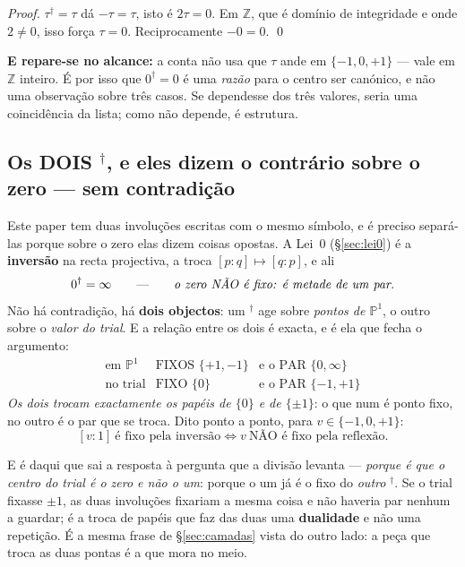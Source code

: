 \documentclass[11pt,a4paper]{article}
\newcommand{\dg}{^{\dagger}}
\begin{document}
\begin{proof}
$\tau\dg=\tau$ dá $-\tau=\tau$, isto é $2\tau=0$. Em $\mathbb{Z}$, que é domínio de
integridade e onde $2\neq0$, isso força $\tau=0$. Reciprocamente $-0=0$. \qed
\end{proof}

\noindent\textbf{E repare-se no alcance:} a conta não usa que $\tau$ ande em
$\{-1,0,+1\}$ --- vale em $\mathbb{Z}$ inteiro. É por isso que $0\dg=0$ é uma
\emph{razão} para o centro ser canónico, e não uma observação sobre três casos. Se
dependesse dos três valores, seria uma coincidência da lista; como não depende, é
estrutura.

\subsection*{Os DOIS $\dg$, e eles dizem o contrário sobre o zero --- sem contradição}

Este paper tem duas involuções escritas com o mesmo símbolo, e é preciso separá-las porque
sobre o zero elas dizem coisas opostas. A Lei~0 (\S\ref{sec:lei0}) é a \textbf{inversão}
na recta projectiva, a troca $[p:q]\mapsto[q:p]$, e ali
\[
0\dg=\infty
\qquad\text{---}\qquad
\emph{o zero NÃO é fixo: é metade de um par.}
\]
Não há contradição, há \textbf{dois objectos}: um $\dg$ age sobre \emph{pontos de
$\mathbb{P}^1$}, o outro sobre o \emph{valor do trial}. E a relação entre os dois é exacta,
e é ela que fecha o argumento:
\[
\boxed{
\begin{array}{lll}
\text{em }\mathbb{P}^1 & \text{FIXOS }\{+1,-1\} & \text{e o PAR }\{0,\infty\}\\[2pt]
\text{no trial} & \text{FIXO }\{0\} & \text{e o PAR }\{-1,+1\}
\end{array}}
\]
\emph{Os dois trocam exactamente os papéis de $\{0\}$ e de $\{\pm1\}$}: o que num é ponto
fixo, no outro é o par que se troca. Dito ponto a ponto, para $v\in\{-1,0,+1\}$:
\[
[v:1]\ \text{é fixo pela inversão}
\iff
v\ \text{NÃO é fixo pela reflexão}.
\]

\noindent E é daqui que sai a resposta à pergunta que a divisão levanta --- \emph{porque é
que o centro do trial é o zero e não o um}: porque o um já é o fixo do \emph{outro} $\dg$.
Se o trial fixasse $\pm1$, as duas involuções fixariam a mesma coisa e não haveria par
nenhum a guardar; é a troca de papéis que faz das duas uma \textbf{dualidade} e não uma
repetição. É a mesma frase de \S\ref{sec:camadas} vista do outro lado: a peça que troca as
duas pontas é a que mora no meio.
\end{document}
